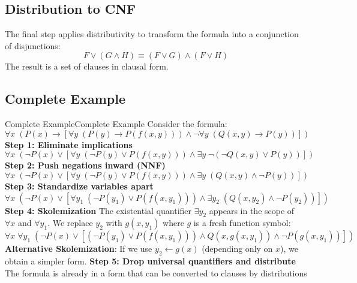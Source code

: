 \documentclass[a4paper]{article}
\theoremstyle{definition}
\begin{document}
\subsection{Distribution to CNF}
The final step applies distributivity to transform the formula into a conjunction of disjunctions:
\[
  F \vee (G \wedge H) \equiv (F \vee G) \wedge (F \vee H)
\]
The result is a set of clauses in clausal form.
\subsection{Complete Example}
\begin{example}{Complete Example}{Complete Example}
Consider the formula:
\[
  \forall x\; (P(x) \rightarrow [\forall y\; (P(y) \rightarrow P(f(x,y))) \wedge \lnot \forall y\; (Q(x,y) \rightarrow P(y))])
\]
\textbf{Step 1: Eliminate implications}
\[
  \forall x\; (\lnot P(x) \vee [\forall y\; (\lnot P(y) \vee P(f(x,y))) \wedge \exists y\; \lnot (\lnot Q(x,y) \vee P(y))])
\]
\textbf{Step 2: Push negations inward (NNF)}
\[
  \forall x\; (\lnot P(x) \vee [\forall y\; (\lnot P(y) \vee P(f(x,y))) \wedge \exists y\; (Q(x,y) \wedge \lnot P(y))])
\]
\textbf{Step 3: Standardize variables apart}
\[
  \forall x\; (\lnot P(x) \vee [\forall y_1\; (\lnot P(y_1) \vee P(f(x,y_1))) \wedge \exists y_2\; (Q(x,y_2) \wedge \lnot P(y_2))])
\]
\textbf{Step 4: Skolemization}
\vspace{1em}
\noindent 
\newline
The existential quantifier \( \exists y_2 \) appears in the scope of \( \forall x \) and \( \forall y_1 \). We replace \( y_2 \) with 
\( g(x,y_1) \) where \( g \) is a fresh function symbol:
\[
  \forall x\; \forall y_1\; (\lnot P(x) \vee [(\lnot P(y_1) \vee P(f(x,y_1))) \wedge Q(x,g(x,y_1)) \wedge \lnot P(g(x,y_1))])
\]
\textbf{Alternative Skolemization}: If we use \( y_2 \leftarrow g(x) \) (depending only on $x$), we obtain a simpler form.
\vspace{1em}
\noindent 
\newline
\textbf{Step 5: Drop universal quantifiers and distribute}
\vspace{1em}
\noindent 
\newline
The formula is already in a form that can be converted to clauses by distributions
\end{example}
\end{document}
